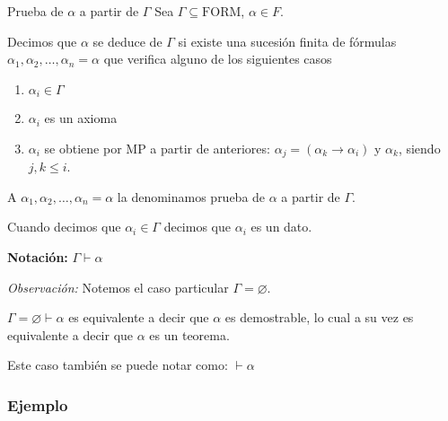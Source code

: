 \begin{definicion}{Prueba de $\alpha$ a partir de $\Gamma$}{}
    Sea $\Gamma \subseteq \mathrm{FORM}$, $\alpha \in F$.

    \medskip

    Decimos que $\alpha$ se deduce de $\Gamma$ si existe una sucesión finita
    de fórmulas $\alpha_1, \alpha_2, \dotsc, \alpha_n = \alpha$ que verifica
    alguno de los siguientes casos 

    \begin{center}
        \begin{enumerate}[%
                        labelindent=*,
                        style=multiline,
                        leftmargin=*,
                        align=left,
                        leftmargin=2\parindent,
                        label=Caso \arabic*)]
            \item $\alpha_i \in \Gamma$ %
            \item $\alpha_i$ es un axioma %
            \item $\alpha_i$ se obtiene por MP a partir de anteriores:
                $\alpha_j = (\alpha_k \to \alpha_i)$ y $\alpha_k$, siendo 
                $j, k \leq i$.
        \end{enumerate}
    \end{center}

    A $\alpha_1, \alpha_2, \dotsc, \alpha_n = \alpha$ la denominamos
    prueba de $\alpha$ a partir de $\Gamma$.

    Cuando decimos que $\alpha_i \in \Gamma$ decimos que $\alpha_i$ es un 
    dato.

    \bigskip
    \textbf{Notación:}
    $\Gamma \vdash \alpha$
    
\end{definicion}


\bigskip
\textit{Observación:}
Notemos el caso particular $\Gamma = \varnothing$.

$\Gamma = \varnothing \vdash \alpha$ es equivalente a decir que $\alpha$ es
demostrable, lo cual a su vez es equivalente a decir que $\alpha$ es un
teorema. 

Este caso también se puede notar como: $\vdash \alpha$


\subsubsection{Ejemplo}

